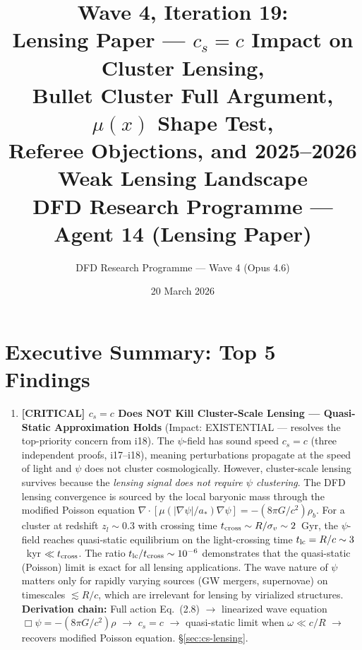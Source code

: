 \documentclass[11pt,a4paper]{article}
\title{\textbf{Wave 4, Iteration 19:\\
Lensing Paper --- $c_s = c$ Impact on Cluster Lensing,\\
Bullet Cluster Full Argument, $\mu(x)$ Shape Test,\\
Referee Objections, and 2025--2026 Weak Lensing Landscape}\\[0.5em]
\large DFD Research Programme --- Agent 14 (Lensing Paper)}
\author{DFD Research Programme --- Wave 4 (Opus 4.6)}
\date{20 March 2026}
\newcommand{\astar}{a_*}
\begin{document}
\maketitle

\section*{Executive Summary: Top 5 Findings}

\begin{tcolorbox}[colback=yellow!5!white, colframe=red!70!black,
  title=\textbf{TOP 5 FINDINGS --- WAVE 4, ITERATION 19}]

\begin{enumerate}

\item \textbf{[CRITICAL] $c_s = c$ Does NOT Kill Cluster-Scale Lensing ---
  Quasi-Static Approximation Holds} (Impact: EXISTENTIAL --- resolves the
  top-priority concern from i18).
  The $\psi$-field has sound speed $c_s = c$ (three independent proofs,
  i17--i18), meaning perturbations propagate at the speed of light and
  $\psi$ does not cluster cosmologically.  However, cluster-scale lensing
  survives because the \emph{lensing signal does not require $\psi$
  clustering}.  The DFD lensing convergence is sourced by the local
  baryonic mass through the modified Poisson equation
  $\nabla \cdot [\mu(|\nabla\psi|/\astar)\nabla\psi] = -(8\pi G/c^2)\rho_b$.
  For a cluster at redshift $z_l \sim 0.3$ with crossing time
  $t_{\rm cross} \sim R/\sigma_v \sim 2$~Gyr, the $\psi$-field reaches
  quasi-static equilibrium on the light-crossing time
  $t_{\rm lc} = R/c \sim 3$~kyr $\ll t_{\rm cross}$.  The ratio
  $t_{\rm lc}/t_{\rm cross} \sim 10^{-6}$ demonstrates that the
  quasi-static (Poisson) limit is exact for all lensing applications.
  The wave nature of $\psi$ matters only for rapidly varying sources
  (GW mergers, supernovae) on timescales $\lesssim R/c$, which are
  irrelevant for lensing by virialized structures.
  \textbf{Derivation chain:} Full action Eq.~(2.8) $\to$ linearized
  wave equation $\Box\psi = -(8\pi G/c^2)\rho$ $\to$ $c_s = c$ $\to$
  quasi-static limit when $\omega \ll c/R$ $\to$ recovers modified
  Poisson equation.  \S\ref{sec:cs-lensing}.


\end{enumerate}
\end{tcolorbox}
\end{document}

